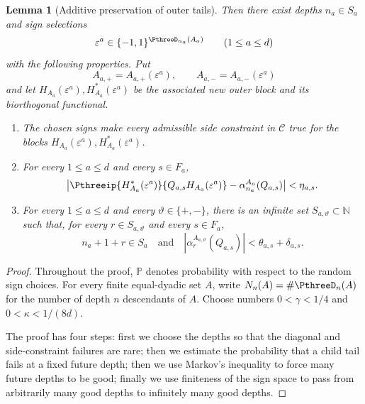 \documentclass[11pt,reqno]{amsart}
\makeatletter
\theoremstyle{plain}
\newtheorem{lemma}[lemma]{Lemma}
\theoremstyle{definition}
\newcommand{\N}{\mathbb N}
\newcounter{problempaper}
\newenvironment{problempaperbody}{%
  \setcounter{subsection}{0}%
  \setcounter{subsubsection}{0}%
  \setcounter{paragraph}{0}%
  \renewcommand{\thesubsection}{\arabic{subsection}}%
  \renewcommand{\thesubsubsection}{\thesubsection.\arabic{subsubsection}}%
  \renewcommand{\theparagraph}{\thesubsubsection.\arabic{paragraph}}%
  \let\problem@outersection\section
  \let\problem@outersubsection\subsection
  \let\problem@outersubsubsection\subsubsection
  \let\problem@outerparagraph\paragraph
  \let\section\problem@papersection
  \let\subsection\problem@papersubsection
  \let\subsubsection\problem@papersubsubsection
}{%
  \let\section\problem@outersection
  \let\subsection\problem@outersubsection
  \let\subsubsection\problem@outersubsubsection
  \let\paragraph\problem@outerparagraph
}
\newcommand{\problem@target}[2]{%
  \hypertarget{problem-\theproblempaper-#1-#2}{}%
}
\newcommand{\problem@paperheading}[3]{%
  \par\bigskip
  \problem@target{#1}{#2}%
  \noindent{\large\bfseries #2.\quad #3\par}%
  \nobreak\smallskip
}
\newcommand{\problem@papersubheading}[3]{%
  \par\medskip
  \problem@target{#1}{#2}%
  \noindent{\normalsize\bfseries #2.\quad #3\par}%
  \nobreak\smallskip
}
\newcommand{\problem@papersubsubheading}[3]{%
  \par\smallskip
  \problem@target{#1}{#2}%
  \noindent{\normalsize\itshape #2.\quad #3.\ }%
}
\def\problem@papersection{%
  \@ifstar{\problem@papersectionstar}{\problem@papersectionnostar}%
}
\def\problem@papersectionstar#1{%
  \par\bigskip\noindent{\large\bfseries #1\par}\nobreak\smallskip
}
\def\problem@papersectionnostar#1{%
  \refstepcounter{subsection}%
  \setcounter{subsubsection}{0}%
  \setcounter{paragraph}{0}%
  \problem@paperheading{section}{\thesubsection}{#1}%
  \problem@writecontentsline{section}{\thesubsection}{#1}%
}
\def\problem@papersubsection{%
  \@ifstar{\problem@papersubsectionstar}{\problem@papersubsectionnostar}%
}
\def\problem@papersubsectionstar#1{%
  \par\medskip\noindent{\normalsize\bfseries #1\par}\nobreak\smallskip
}
\def\problem@papersubsectionnostar#1{%
  \refstepcounter{subsubsection}%
  \setcounter{paragraph}{0}%
  \problem@papersubheading{subsection}{\thesubsubsection}{#1}%
  \problem@writecontentsline{subsection}{\thesubsubsection}{#1}%
}
\def\problem@papersubsubsection{%
  \@ifstar{\problem@papersubsubsectionstar}{\problem@papersubsubsectionnostar}%
}
\def\problem@papersubsubsectionstar#1{%
  \par\smallskip\noindent{\normalsize\itshape #1.\ }%
}
\def\problem@papersubsubsectionnostar#1{%
  \refstepcounter{paragraph}%
  \problem@papersubsubheading{subsubsection}{\theparagraph}{#1}%
  \problem@writecontentsline{subsubsection}{\theparagraph}{#1}%
}
\newcommand{\problem@writecontentsline}[3]{%
  \begingroup
  \protected@write\@auxout{}{%
    \string\problemcontentsentry{\theproblempaper}{#1}{#2}{#3}{\thepage}%
  }%
  \endgroup
}
\newcommand{\problemcontentsentry}[5]{%
  \@ifundefined{problemcontents@#1}{%
    \expandafter\gdef\csname problemcontents@#1\endcsname{}%
  }{}%
  \expandafter\g@addto@macro\csname problemcontents@#1\endcsname{%
    \problemcontentsline{#1}{#2}{#3}{#4}{#5}%
  }%
}
\newcommand{\problemcontentslink}[4]{%
  \hyperlink{problem-#1-#2-#3}{#4}%
}
\newcommand{\problemcontentsline}[5]{%
  \ifstrequal{#2}{section}{%
    \par\noindent
    \problemcontentslink{#1}{#2}{#3}{\makebox[2.5em][l]{#3}#4}%
    \nobreak\dotfill
    \problemcontentslink{#1}{#2}{#3}{#5}\par
  }{%
    \ifstrequal{#2}{subsection}{%
      \par\noindent\hspace*{1.5em}%
      \problemcontentslink{#1}{#2}{#3}{\makebox[3.5em][l]{#3}#4}%
      \nobreak\dotfill
      \problemcontentslink{#1}{#2}{#3}{#5}\par
    }{%
      \par\noindent\hspace*{3em}%
      \problemcontentslink{#1}{#2}{#3}{\makebox[4.5em][l]{#3}#4}%
      \nobreak\dotfill
      \problemcontentslink{#1}{#2}{#3}{#5}\par
    }%
  }%
}
\makeatother
\begin{document}
\begin{problempaperbody}
\begin{lemma}[Additive preservation of outer tails]
Then there exist depths $n_a\in S_a$ and sign selections
\begin{equation*}
        \varepsilon^a\in\{-1,1\}^{\PthreeD_{n_a}(A_a)}\qquad(1\leq a\leq d)
\end{equation*}
with the following properties. Put
\begin{equation*}
        A_{a,+}=A_{a,+}(\varepsilon^a),\qquad A_{a,-}=A_{a,-}(\varepsilon^a)
\end{equation*}
and let $H_{A_a}(\varepsilon^a),H_{A_a}^*(\varepsilon^a)$ be the associated new outer block and its biorthogonal functional.

\begin{enumerate}[label=\textup{(\roman*)}]
\item \label{p3:item:outer-tail-concl-side} The chosen signs make every admissible side constraint in $\mathscr C$ true for the blocks $H_{A_a}(\varepsilon^a),H_{A_a}^*(\varepsilon^a)$.

\item \label{p3:item:outer-tail-concl-diagonal} For every $1\leq a\leq d$ and every $s\in F_a$,
\begin{equation}
\label{p3:eq:outer-tail-new-diagonal}
        \left|\Pthreeip{H_{A_a}^*(\varepsilon^a)}{Q_{a,s}H_{A_a}(\varepsilon^a)}-\alpha_{n_a}^{A_a}(Q_{a,s})\right|<\eta_{a,s}.
\end{equation}

\item \label{p3:item:outer-tail-concl-child-tail} For every $1\leq a\leq d$ and every $\vartheta\in\{+,-\}$, there is an infinite set $S_{a,\vartheta}\subset\N$ such that, for every $r\in S_{a,\vartheta}$ and every $s\in F_a$,
\begin{equation}
\label{p3:eq:outer-tail-child-tail}
        n_a+1+r\in S_a\quad\text{and}\quad |\alpha_r^{A_{a,\vartheta}}(Q_{a,s})|<\theta_{a,s}+\delta_{a,s}.
\end{equation}
\end{enumerate}
\end{lemma}
\begin{proof}
Throughout the proof, $\mathbb P$ denotes probability with respect to the random sign choices. For every finite equal-dyadic set $A$, write $N_n(A)=\#\PthreeD_n(A)$ for the number of depth $n$ descendants of $A$. Choose numbers $0<\gamma<1/4$ and $0<\kappa<1/(8d)$. 

The proof has four steps: first we choose the depths so that the diagonal and side-constraint failures are rare; then we estimate the probability that a child tail fails at a fixed future depth; then we use Markov's inequality to force many future depths to be good; finally we use finiteness of the sign space to pass from arbitrarily many good depths to infinitely many good depths. 


\end{proof}
\end{problempaperbody}
\end{document}

